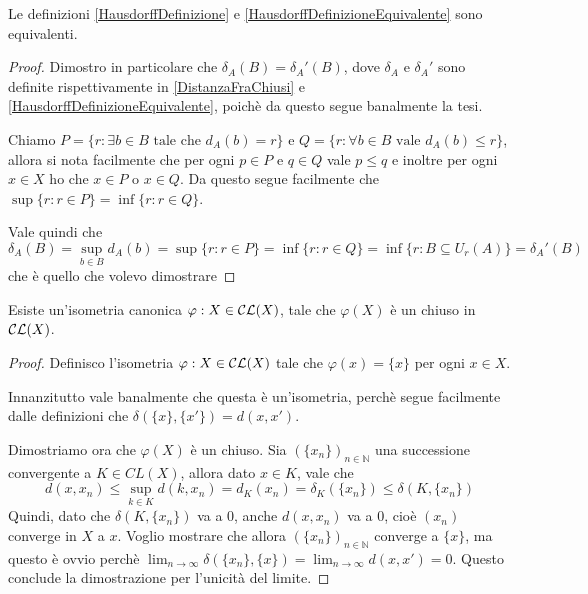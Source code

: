 \begin{theorem}
	Le definizioni \cref{HausdorffDefinizione} e \cref{HausdorffDefinizioneEquivalente} sono equivalenti.
\end{theorem}
\begin{proof}
	Dimostro in particolare che $\delta_A(B)=\delta_A'(B)$, dove $\delta_A$ e $\delta_A'$ sono definite rispettivamente in \cref{DistanzaFraChiusi} e \cref{HausdorffDefinizioneEquivalente}, poichè da questo segue banalmente la tesi.
	
	Chiamo $P=\{ r : \exists b\in B \text{ tale che }d_A(b)=r \}$ e $Q=\{ r: \forall b\in B\text{ vale } d_A(b)\le r \}$, allora si nota facilmente che per ogni $p\in P$ e $q\in Q$ vale $p\le q$ e inoltre per ogni $x\in X$ ho che $x\in P$ o $x\in Q$. Da questo segue facilmente che $\sup\{ r: r\in P \}=\inf\{r: r\in Q \}$.
	
	Vale quindi che
	\begin{equation*}
		\delta_A(B)=\sup_{b\in B} d_A(b)=\sup\{ r : r\in P \}=\inf\{ r : r\in Q \}= \inf\{ r : B\subseteq U_r(A) \}=\delta_A'(B)
	\end{equation*}
	che è quello che volevo dimostrare
\end{proof}

\begin{lemma}\label{IsometriaCanonica}
	Esiste un'isometria canonica $\varphi: X\in \mathcal{CL}(X)$, tale che $\varphi(X)$ è un chiuso in $\mathcal{CL}(X)$.
\end{lemma}
\begin{proof}
	Definisco l'isometria $\varphi: X\in\mathcal{CL}(X)$ tale che $\varphi(x)=\{x\}$ per ogni $x\in X$. 
	
	Innanzitutto vale banalmente che questa è un'isometria, perchè segue facilmente dalle definizioni che $\delta(\{ x \}, \{ x' \})=d(x,x')$.
	
	Dimostriamo ora che $\varphi(X)$ è un chiuso. Sia $(\{ x_n \})_{n\in \mathbb{N}}$ una successione convergente a $K\in CL(X)$, allora dato $x\in K$, vale che
	\begin{equation*}
		d(x,x_n)\le \sup_{k\in K} d(k,x_n)=d_K(x_n)=\delta_K(\{x_n\})\le \delta(K,\{x_n \})
	\end{equation*}
	Quindi, dato che $\delta(K,\{x_n \})$ va a 0, anche $d(x,x_n)$ va a 0, cioè $(x_n)$ converge in $X$ a $x$. Voglio mostrare che allora $(\{ x_n \})_{n\in \mathbb{N}}$ converge a $\{ x \}$, ma questo è ovvio perchè $\lim_{n\to\infty} \delta(\{ x_n \}, \{x\})=\lim_{n\to\infty} d(x,x')=0$. Questo conclude la dimostrazione per l'unicità del limite.
\end{proof}









